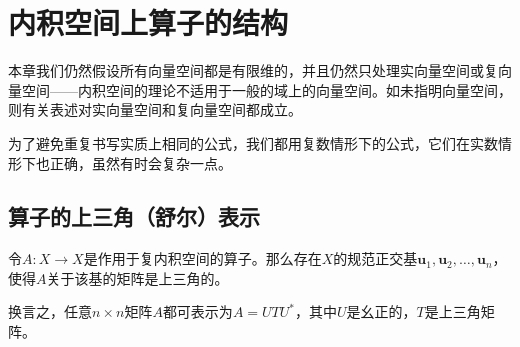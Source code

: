 
\chapter{内积空间上算子的结构}\label{chap:StructinInnerProdSpace}

本章我们仍然假设所有向量空间都是有限维的，并且仍然只处理实向量空间或复向量空间——内积空间的理论不适用于一般的域上的向量空间。如未指明向量空间，则有关表述对实向量空间和复向量空间都成立。

为了避免重复书写实质上相同的公式，我们都用复数情形下的公式，它们在实数情形下也正确，虽然有时会复杂一点。

\section{算子的上三角（舒尔）表示}

\begin{theorem}\label{thm:schur}
    令$A:X\to X$是作用于复内积空间的算子。那么存在$X$的规范正交基$\mathbf{u}_{1},\mathbf{u}_{2},\ldots,\mathbf{u}_{n}$，使得$A$关于该基的矩阵是上三角的。

    换言之，任意$n\times n$矩阵$A$都可表示为$A=UTU^*$，其中$U$是幺正的，$T$是上三角矩阵。
\end{theorem}

